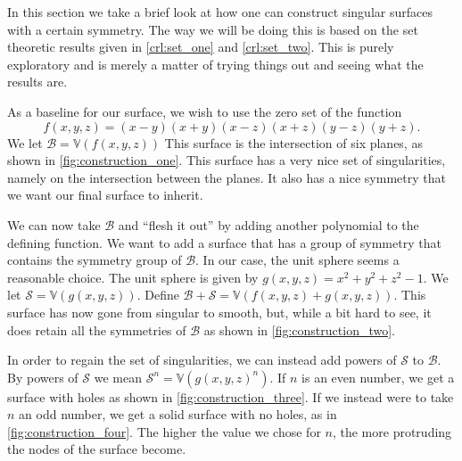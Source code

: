 \documentclass{article}
\newcommand{\V}{\ensuremath{\mathbb{V}}}
\begin{document}
    In this section we take a brief look at how one can construct singular
    surfaces with a certain symmetry. The way we will be doing this is based on
    the set theoretic results given in \cref{crl:set_one} and
    \cref{crl:set_two}. This is purely exploratory and is merely a matter of
    trying things out and seeing what the results are.

    As a baseline for our surface, we wish to use the zero set of the function
    \begin{equation*}
        f(x, y, z) = (x - y)(x + y)(x - z)(x + z)(y - z)(y + z).
    \end{equation*}
    We let $\mathcal{B} = \V(f(x, y, z))$ This surface is the intersection of
    six planes, as shown in \cref{fig:construction_one}. This surface has a
    very nice set of singularities, namely on the intersection between the
    planes. It also has a nice symmetry that we want our final surface to
    inherit.

    We can now take $\mathcal{B}$ and ``flesh it out'' by adding another
    polynomial to the defining function. We want to add a surface that has a
    group of symmetry that contains the symmetry group of $\mathcal{B}$. In our
    case, the unit sphere seems a reasonable choice. The unit sphere is given
    by $g(x, y, z) = x^2 + y^2 + z^2 - 1$. We let $\mathcal{S} = \V(g(x, y,
    z))$. Define $\mathcal{B} + \mathcal{S} = \V(f(x, y, z) + g(x, y, z))$.
    This surface has now gone from singular to smooth, but, while a bit hard to
    see, it does retain all the symmetries of $\mathcal{B}$ as shown in
    \cref{fig:construction_two}.

    In order to regain the set of singularities, we can instead add powers of
    $\mathcal{S}$ to $\mathcal{B}$. By powers of $\mathcal{S}$ we mean
    $\mathcal{S}^n = \V(g(x, y, z)^n)$. If $n$ is an even number, we get a
    surface with holes as shown in \cref{fig:construction_three}. If we instead
    were to take $n$ an odd number, we get a solid surface with no holes, as in
    \cref{fig:construction_four}. The higher the value we chose for $n$, the
    more protruding the nodes of the surface become.

           
\end{document}
